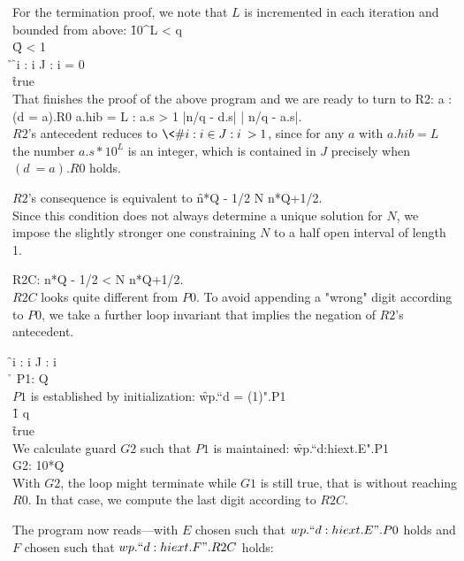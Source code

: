 For the termination proof, we note that $L$ is incremented in each iteration
and bounded from above:
\f   10^L < q\\
\f   Q < 1\\
\h{}
\f   \<\nbr i : i \in J : i\> = 0\\
\f   true\\

That finishes the proof of the above program and we are ready to turn to
\nf R2: \<\nbr a : (d \:= a).R0 \mand a.hib = L : a.s \> > 1
\mimpl |n/q - d.s| \le | n/q - a.s|\qquad.\\

$R2$'s antecedent reduces to $\<\nbr i : i \in J : i\> > 1$, since
for any $a$ with $a.hib = L$ the number $a.s*10^L$ is an integer,
which is contained in $J$ precisely when $(d \:= a).R0$ holds.

$R2$'s consequence is equivalent to
\f n*Q - 1/2 \le N \le n*Q+1/2\qquad.\\
Since this condition does not always determine a unique solution
for $N$, we impose the slightly stronger one constraining $N$ to
a half open interval of length 1.

\nf R2C: n*Q - 1/2 < N \le n*Q+1/2\qquad.\\
\filbreak
$R2C$ looks quite different from $P0$. To avoid appending a "wrong"
digit according to $P0$, we take a further loop invariant that
implies the negation of $R2$'s antecedent.

\f \<\nbr i : i \in J : i\> \\
\h{}
\nf P1: Q \\

$P1$ is established by initialization:
\f   wp.``d \:= (1)".P1 \\
\f   1 \le q\\
\f   true\\

We calculate guard $G2$ such that $P1$ is maintained:
\f   wp.``d:hiext.E".P1\\
\nf G2: 10*Q \\

With $G2$, the loop might terminate while $G1$ is still true, that is without
reaching $R0$. In that case, we compute the last digit according to $R2C$.

The program now reads---with $E$ chosen such that $wp.``d:hiext.E".P0$ holds
and $F$ chosen such that $wp.``d:hiext.F".R2C$ holds:

